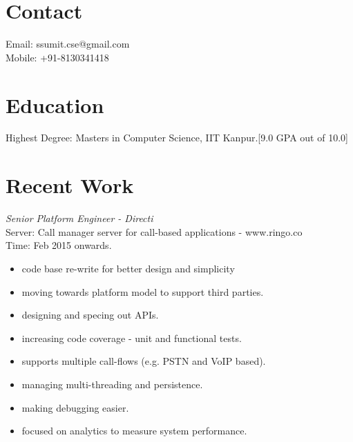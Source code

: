 \documentclass[margin,line]{resume}
\begin{document}
\begin{resume}

    \section{\mysidestyle Contact}
    	Email: ssumit.cse@gmail.com\\
    	Mobile: +91-8130341418
    \section{\mysidestyle Education}
	Highest Degree: Masters in Computer Science, IIT Kanpur.[9.0 GPA out of 10.0]

    \section{\mysidestyle Recent Work}

\textit{Senior Platform Engineer - Directi} \\
Server: Call manager server for call-based applications - www.ringo.co\\
Time: Feb 2015 onwards.\\
\begin{itemize}
	\item code base re-write for better design and simplicity
        \item moving towards platform model to support third parties.
        \item designing and specing out APIs.
	\item increasing code coverage - unit and functional tests.
	\item supports multiple call-flows (e.g. PSTN and VoIP based).
	\item managing multi-threading and persistence.
	\item making debugging easier.
        \item focused on analytics to measure system performance.
\end{itemize}


\end{resume}
\end{document}
